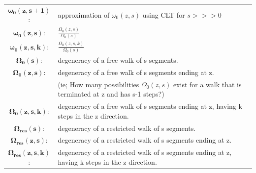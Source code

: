 \documentclass[10pt,letterpaper]{article}
\begin{document}
\begin{tabular}{c|l}
$\mathbf{\omega_0(z,s+1)}$:&approximation of $\omega_0(z,s)$ using CLT for $s>>>0$ \\
$\mathbf{\omega_{0}(z,s)}$:& $\frac{\Omega_0(z,s)}{\Omega_0(s)}$\\
$\mathbf{\omega_{0}(z,s,k)}$:& $\frac{\Omega_0(z,s,k)}{\Omega_0(s)}$\\
$\mathbf{\Omega_{0}(s)}$:& degeneracy of a free walk of s segments.\\
$\mathbf{\Omega_{0}(z,s)}$:&degeneracy of a free walk of s segments ending at z.\\
&(ie; How many possibilities $\Omega_{0}(z,s)$ exist for a walk that is terminated at z and has s-1 steps?)\\
$\mathbf{\Omega_{0}(z,s,k)}$: & degeneracy of a free walk of s segments ending at z, having k steps in the z direction.\\
$\mathbf{\Omega_{res}(s)}$:&degeneracy of a restricted walk of s segments.\\
$\mathbf{\Omega_{res}(z,s)}$:&degeneracy of a restricted walk of s segments ending at z.\\
$\mathbf{\Omega_{res}(z,s,k)}$:&degeneracy of a restricted walk of s segments ending at z, having k steps in the z direction.\\
\hline
\end{tabular} 
		
		
		
\end{document}
